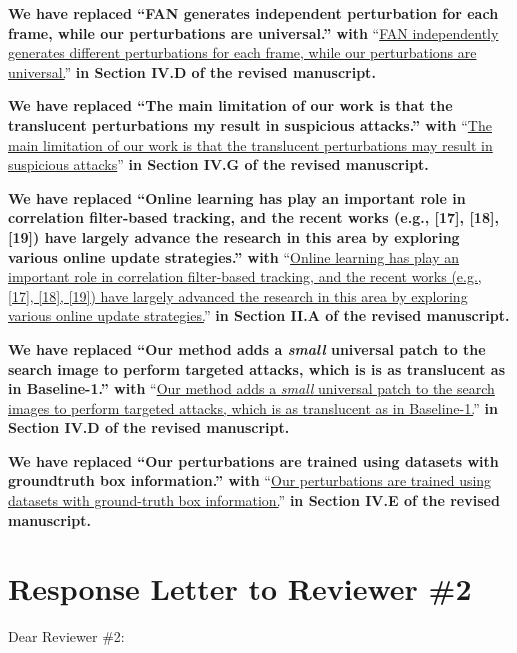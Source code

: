 \documentclass[12pt]{article}
\begin{document}
\textbf{We have replaced ``FAN generates independent perturbation for each frame, while our perturbations are universal.'' with} ``\uline{FAN independently generates different perturbations for each frame, while our perturbations are universal.}'' \textbf{in Section IV.D of the revised manuscript.}

\textbf{We have replaced ``The main limitation of our work is that the translucent perturbations my result in suspicious attacks.'' with} ``\uline{The main limitation of our work is that the translucent perturbations may result in suspicious attacks}'' \textbf{in Section IV.G of the revised manuscript.}

\textbf{We have replaced ``Online learning has play an important role in correlation filter-based tracking, and the recent works (e.g., [17], [18], [19]) have largely advance the research in this area by exploring various online update strategies.'' with} ``\uline{Online learning has play an important role in correlation filter-based tracking, and the recent works (e.g., [17], [18], [19]) have largely advanced the research in this area by exploring various online update strategies.}'' \textbf{in Section II.A of the revised manuscript.}

\textbf{We have replaced ``Our method adds a \textit{small} universal patch to the search image to perform targeted attacks, which is is as translucent as in Baseline-1.'' with} ``\uline{Our method adds a \textit{small} universal patch to the search images to perform targeted attacks, which is as translucent as in Baseline-1.}'' \textbf{in Section IV.D of the revised manuscript.}

\textbf{We have replaced ``Our perturbations are trained using datasets with groundtruth box information.'' with} ``\uline{Our perturbations are trained using datasets with ground-truth box information.}'' \textbf{in Section IV.E of the revised manuscript.}

\newpage
{\centering\section*{Response Letter to Reviewer \#2}}
\noindent Dear Reviewer \#2:
\end{document}
